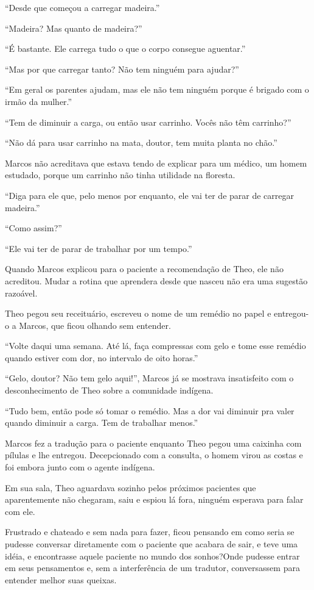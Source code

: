 ``Desde que começou a carregar madeira.''

``Madeira? Mas quanto de madeira?''

``É bastante. Ele carrega tudo o que o corpo consegue aguentar.''

``Mas por que carregar tanto? Não tem ninguém para ajudar?''

``Em geral os parentes ajudam, mas ele não tem ninguém porque é brigado
com o irmão da mulher.''

``Tem de diminuir a carga, ou então usar carrinho. Vocês não têm
carrinho?''

``Não dá para usar carrinho na mata, doutor, tem muita planta no chão.''

Marcos não acreditava que estava tendo de explicar para um médico, um
homem estudado, porque um carrinho não tinha utilidade na floresta.

``Diga para ele que, pelo menos por enquanto, ele vai ter de parar de
carregar madeira.''

``Como assim?''

``Ele vai ter de parar de trabalhar por um tempo.''

Quando Marcos explicou para o paciente a recomendação de Theo, ele não
acreditou. Mudar a rotina que aprendera desde que nasceu não era uma
sugestão razoável.

Theo pegou seu receituário, escreveu o nome de um remédio no papel e
entregou-o a Marcos, que ficou olhando sem entender.

``Volte daqui uma semana. Até lá, faça compressas com gelo e tome esse
remédio quando estiver com dor, no intervalo de oito horas.''

``Gelo, doutor? Não tem gelo aqui!'', Marcos já se mostrava insatisfeito
com o desconhecimento de Theo sobre a comunidade indígena.

``Tudo bem, então pode só tomar o remédio. Mas a dor vai diminuir pra
valer quando diminuir a carga. Tem de trabalhar menos.''

Marcos fez a tradução para o paciente enquanto Theo pegou uma caixinha
com pílulas e lhe entregou. Decepcionado com a consulta, o homem virou
as costas e foi embora junto com o agente indígena.

Em sua sala, Theo aguardava sozinho pelos próximos pacientes que
aparentemente não chegaram, saiu e espiou lá fora, ninguém esperava para
falar com ele.

Frustrado e chateado e sem nada para fazer, ficou pensando em como seria
se pudesse conversar diretamente com o paciente que acabara de sair, e
teve uma idéia, e encontrasse aquele paciente no mundo dos sonhos?Onde
pudesse entrar em seus pensamentos e, sem a interferência de um
tradutor, conversassem para entender melhor suas queixas.

